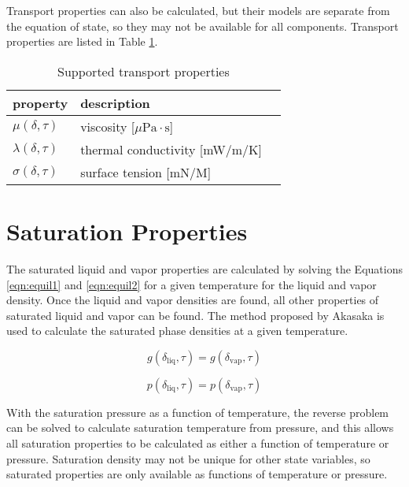 \documentclass[oneside]{book}
\begin{document}
Transport properties can also be calculated, but their models are separate from the equation of state, so they may not be available for all components.  Transport properties are listed in Table \ref{table:supported_transport_properties}.
\begin{table}[h!]
\centering
\caption{Supported transport properties}
\begin{tabular}{ l l l }
\hline
property & description  \\
\hline
\hline
$\mu(\delta, \tau)$ & viscosity [$\mu \text{Pa} \cdot \text{s}$] \\ [1ex]
$\lambda(\delta, \tau)$ & thermal conductivity [mW/m/K] \\ [1ex]
$\sigma(\delta, \tau)$ & surface tension [mN/M] \\ [1ex]
 \hline    
\end{tabular}
\label{table:supported_transport_properties}
\end{table}

\section{Saturation Properties}

The saturated liquid and vapor properties are calculated by solving the Equations \ref{eqn:equil1} and \ref{eqn:equil2} for a given temperature for the liquid and vapor density.  Once the liquid and vapor densities are found, all other properties of saturated liquid and vapor can be found.  The method proposed by Akasaka \cite{akasaka2008reliable} is used to calculate the saturated phase densities at a given temperature.

\begin{equation}\label{eqn:equil1}
	g(\delta_{\text{liq}}, \tau) = g(\delta_{\text{vap}}, \tau)
\end{equation} 

\begin{equation}\label{eqn:equil2}
	p(\delta_{\text{liq}}, \tau) = p(\delta_{\text{vap}}, \tau)
\end{equation} 

With the saturation pressure as a function of temperature, the reverse problem can be solved to calculate saturation temperature from pressure, and this allows all saturation properties to be calculated as either a function of temperature or pressure. Saturation density may not be unique for other state variables, so saturated properties are only available as functions of temperature or pressure.
\end{document}
